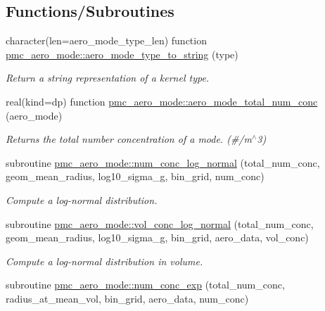 \subsection*{Functions/\+Subroutines}
\begin{DoxyCompactItemize}
\item 
character(len=aero\+\_\+mode\+\_\+type\+\_\+len) function \mbox{\hyperlink{namespacepmc__aero__mode_abbf5d1701e0dacb20f4b15ed2c21263d}{pmc\+\_\+aero\+\_\+mode\+::aero\+\_\+mode\+\_\+type\+\_\+to\+\_\+string}} (type)
\begin{DoxyCompactList}\small\item\em Return a string representation of a kernel type. \end{DoxyCompactList}\item 
real(kind=dp) function \mbox{\hyperlink{namespacepmc__aero__mode_a0ad3b898ec31340554222a17865f44fc}{pmc\+\_\+aero\+\_\+mode\+::aero\+\_\+mode\+\_\+total\+\_\+num\+\_\+conc}} (aero\+\_\+mode)
\begin{DoxyCompactList}\small\item\em Returns the total number concentration of a mode. (\#/m$^\wedge$3) \end{DoxyCompactList}\item 
subroutine \mbox{\hyperlink{namespacepmc__aero__mode_a81402ddac6d037dc9667b04d4e534e74}{pmc\+\_\+aero\+\_\+mode\+::num\+\_\+conc\+\_\+log\+\_\+normal}} (total\+\_\+num\+\_\+conc, geom\+\_\+mean\+\_\+radius, log10\+\_\+sigma\+\_\+g, bin\+\_\+grid, num\+\_\+conc)
\begin{DoxyCompactList}\small\item\em Compute a log-\/normal distribution. \end{DoxyCompactList}\item 
subroutine \mbox{\hyperlink{namespacepmc__aero__mode_a486d23e34343f1b23fff025be1889602}{pmc\+\_\+aero\+\_\+mode\+::vol\+\_\+conc\+\_\+log\+\_\+normal}} (total\+\_\+num\+\_\+conc, geom\+\_\+mean\+\_\+radius, log10\+\_\+sigma\+\_\+g, bin\+\_\+grid, aero\+\_\+data, vol\+\_\+conc)
\begin{DoxyCompactList}\small\item\em Compute a log-\/normal distribution in volume. \end{DoxyCompactList}\item 
subroutine \mbox{\hyperlink{namespacepmc__aero__mode_afcef101dd62d9eea52e00a12bd36550e}{pmc\+\_\+aero\+\_\+mode\+::num\+\_\+conc\+\_\+exp}} (total\+\_\+num\+\_\+conc, radius\+\_\+at\+\_\+mean\+\_\+vol, bin\+\_\+grid, aero\+\_\+data, num\+\_\+conc)

\end{DoxyCompactItemize}
